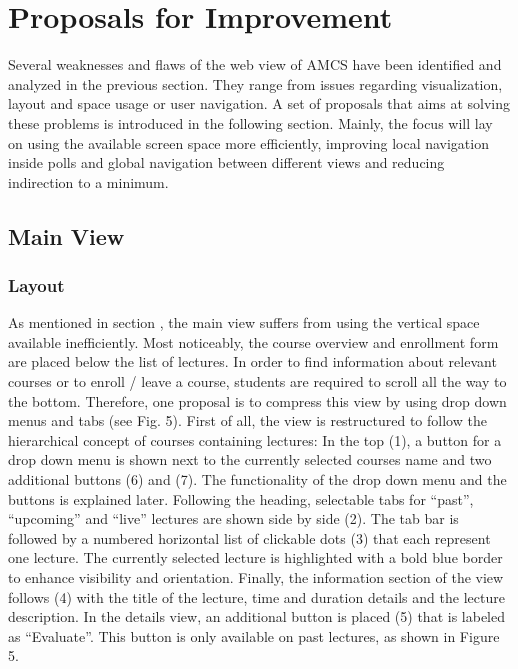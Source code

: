 \section{Proposals for Improvement}

Several weaknesses and flaws of the web view of AMCS have been identified and analyzed in the previous section. They range from issues regarding visualization, layout and space usage or user navigation.
A set of proposals that aims at solving these problems is introduced in the following section. Mainly, the focus will lay on using the available screen space more efficiently, improving local navigation inside polls and global navigation between different views and reducing indirection to a minimum.

\subsection{Main View}

\subsubsection{Layout}
As mentioned in section \todosct, the main view suffers from using the vertical space available inefficiently. Most noticeably, the course overview and enrollment form are placed below the list of lectures. In order to find information about relevant courses or to enroll / leave a course, students are required to scroll all the way to the bottom. 
Therefore, one proposal is to compress this view by using drop down menus and tabs (see Fig. 5). First of all, the view is restructured to follow the hierarchical concept of courses containing lectures: In the top (1), a button for a drop down menu is shown next to the currently selected courses name and two additional buttons (6) and (7). The functionality of the drop down menu and the buttons is explained later.
Following the heading, selectable tabs for “past”, “upcoming” and “live” lectures are shown side by side (2). The tab bar is followed by a numbered horizontal list of clickable dots (3) that each represent one lecture. The currently selected lecture is highlighted with a bold blue border to enhance visibility and orientation. Finally, the information section of the view follows (4) with the title of the lecture, time and duration details and the lecture description. In the details view, an additional button is placed (5) that is labeled as “Evaluate”. This button is only available on past lectures, as shown in Figure 5.

